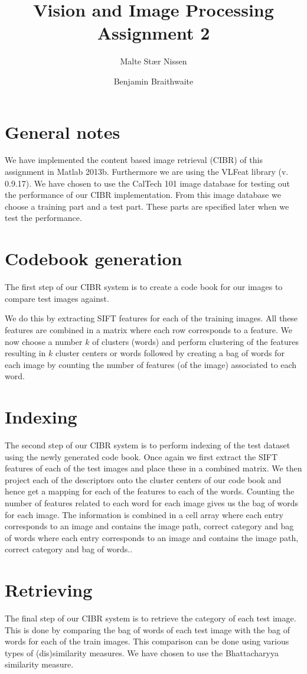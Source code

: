 \documentclass[11pt,a4paper]{article}
\title{Vision and Image Processing\\Assignment 2}
\author{Malte Stær Nissen \and Benjamin Braithwaite}
\begin{document}
\maketitle

\section{General notes}
We have implemented the content based image retrieval (CIBR) of this assignment
in Matlab 2013b. Furthermore we are using the VLFeat library (v. 0.9.17). We
have chosen to use the CalTech 101 image database for testing out the
performance of our CIBR implementation. From this image database we choose a
training part and a test part. These parts are specified later when we test the
performance.

\section{Codebook generation}
The first step of our CIBR system is to create a code book for our images to
compare test images against.

We do this by extracting SIFT features for each of the training images. All
these features are combined in a matrix where each row corresponds to a
feature. We now choose a number $k$ of clusters (words) and perform clustering
of the features resulting in $k$ cluster centers or words followed by creating
a bag of words for each image by counting the number of features (of the image)
associated to each word.

\section{Indexing}
The second step of our CIBR system is to perform indexing of the test dataset
using the newly generated code book. Once again we first extract the SIFT
features of each of the test images and place these in a combined matrix. We
then project each of the descriptors onto the cluster centers of our code book
and hence get a mapping for each of the features to each of the words. Counting
the number of features related to each word for each image gives us the bag of
words for each image. The information is combined in a cell array where each
entry corresponds to an image and contains the image path, correct category and
bag of words where each entry corresponds to an image and contains the image
path, correct category and bag of words..

\section{Retrieving}
The final step of our CIBR system is to retrieve the category of each test
image. This is done by comparing the bag of words of each test image with the
bag of words for each of the train images. This comparison can be done using
various types of (dis)similarity measures. We have chosen to use the
Bhattacharyya similarity measure.
\end{document}
